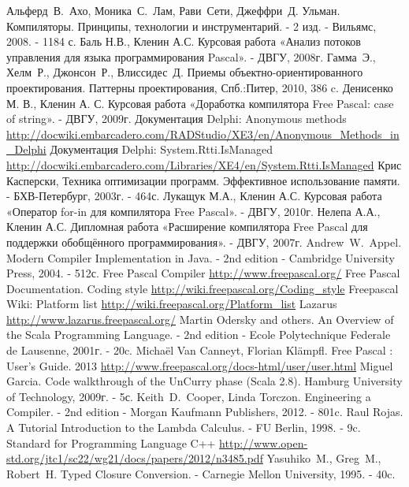\documentclass{imcs}
\begin{document}
\pagebreak

\begin{thebibliography}{99}
 Альферд~В.~Ахо, Моника~С.~Лам, Рави~Сети, Джеффри~Д. Ульман. Компиляторы. Принципы, технологии и инструментарий. - 2 изд. - Вильямс, 2008. - 1184 с.
 Баль Н.В., Кленин А.С. Курсовая работа «Анализ потоков управления для языка программирования Pascal». - ДВГУ, 2008г.
 Гамма~Э., Хелм~Р., Джонсон~Р., Влиссидес~Д. Приемы объектно-ориентированного проектирования. Паттерны проектирования, Спб.:Питер, 2010, 386 c.
 Денисенко М. В., Кленин А. С. Курсовая работа «Доработка компилятора Free Pascal: case of string». - ДВГУ, 2009г.
 Документация Delphi: Anonymous methods \url{http://docwiki.embarcadero.com/RADStudio/XE3/en/Anonymous_Methods_in_Delphi}
 Документация Delphi: System.Rtti.IsManaged \url{http://docwiki.embarcadero.com/Libraries/XE4/en/System.Rtti.IsManaged}
 Крис Касперски, Техника оптимизации программ. Эффективное использование памяти. - БХВ-Петербург, 2003г. - 464с.
 Лукащук М.А., Кленин А.С. Курсовая работа «Оператор for-in для компилятора Free Pascal». - ДВГУ, 2010г.
 Нелепа А.А., Кленин А.С. Дипломная работа «Расширение компилятора Free Pascal для поддержки обобщённого программирования». - ДВГУ, 2007г.
 Andrew~W.~Appel. Modern Compiler Implementation in Java. - 2nd edition - Cambridge University Press, 2004. - 512с.
 Free Pascal Compiler \url{http://www.freepascal.org/}
 Free Pascal Documentation. Coding style \url{http://wiki.freepascal.org/Coding_style}
 Freepascal Wiki: Platform list \url{http://wiki.freepascal.org/Platform_list}
 Lazarus \url{http://www.lazarus.freepascal.org/}
 Martin Odersky and others. An Overview of the Scala Programming Language. - 2nd edition - Ecole Polytechnique Federale de Lausenne, 2001г. - 20c.
 Michaël Van Canneyt, Florian Klämpfl. Free Pascal : User’s Guide. 2013 \url{http://www.freepascal.org/docs-html/user/user.html}
 Miguel Garcia. Code walkthrough of the UnCurry phase (Scala 2.8). Hamburg University of Technology, 2009г. - 5с.
 Keith~D.~Cooper, Linda Torczon. Engineering a Compiler. - 2nd edition - Morgan Kaufmann Publishers, 2012. - 801c.
 Raul Rojas. A Tutorial Introduction to the Lambda Calculus. - FU Berlin, 1998. - 9c.
 Standard for Programming Language C++ \url{http://www.open-std.org/jtc1/sc22/wg21/docs/papers/2012/n3485.pdf}
 Yasuhiko~M., Greg~M., Robert~H. Typed  Closure Conversion. - Carnegie Mellon University, 1995. - 40c.







\end{thebibliography}
\end{document}
